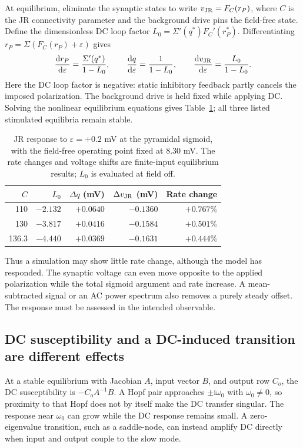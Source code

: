 \documentclass[11pt,a4paper]{article}
\newcommand{\ii}{\mathrm i}
\newcommand{\dd}{\mathrm d}
\begin{document}
At equilibrium, eliminate the synaptic states to write $v_{\rm JR}=F_C(r_P)$, where $C$ is the JR connectivity parameter and the background drive pins the field-free state. Define the dimensionless DC loop factor $L_0=\Sigma'(q^*)F_C'(r_P^*)$. Differentiating $r_P=\Sigma(F_C(r_P)+\varepsilon)$ gives
\begin{equation}
\frac{\dd r_P}{\dd\varepsilon}=\frac{\Sigma'(q^*)}{1-L_0},\qquad
\frac{\dd q}{\dd\varepsilon}=\frac1{1-L_0},\qquad
\frac{\dd v_{\rm JR}}{\dd\varepsilon}=\frac{L_0}{1-L_0}.
\label{eq:jrdc}
\end{equation}
Here the DC loop factor is negative: static inhibitory feedback partly cancels the imposed polarization. The background drive is held fixed while applying DC. Solving the nonlinear equilibrium equations gives Table~\ref{tab:jrdc}; all three listed stimulated equilibria remain stable.

\begin{table}[ht]
\centering\small
\caption{JR response to $\varepsilon=+0.2$ mV at the pyramidal sigmoid, with the field-free operating point fixed at $8.30$ mV. The rate changes and voltage shifts are finite-input equilibrium results; $L_0$ is evaluated at field off.}
\label{tab:jrdc}
\begin{tabular}{@{}rrrrr@{}}
\toprule
$C$ & $L_0$ & $\Delta q$ (mV) & $\Delta v_{\rm JR}$ (mV) & Rate change\\\midrule
110 & $-2.132$ & $+0.0640$ & $-0.1360$ & $+0.767\%$\\
130 & $-3.817$ & $+0.0416$ & $-0.1584$ & $+0.501\%$\\
136.3 & $-4.440$ & $+0.0369$ & $-0.1631$ & $+0.444\%$\\\bottomrule
\end{tabular}
\end{table}

Thus a simulation may show little rate change, although the model has responded. The synaptic voltage can even move opposite to the applied polarization while the total sigmoid argument and rate increase. A mean-subtracted signal or an AC power spectrum also removes a purely steady offset. The response must be assessed in the intended observable.

\subsection{DC susceptibility and a DC-induced transition are different effects}

At a stable equilibrium with Jacobian $A$, input vector $B$, and output row $C_o$, the DC susceptibility is $-C_oA^{-1}B$. A Hopf pair approaches $\pm\ii\omega_0$ with $\omega_0\ne0$, so proximity to that Hopf does not by itself make the DC transfer singular. The response near $\omega_0$ can grow while the DC response remains small. A zero-eigenvalue transition, such as a saddle-node, can instead amplify DC directly when input and output couple to the slow mode.
\end{document}
